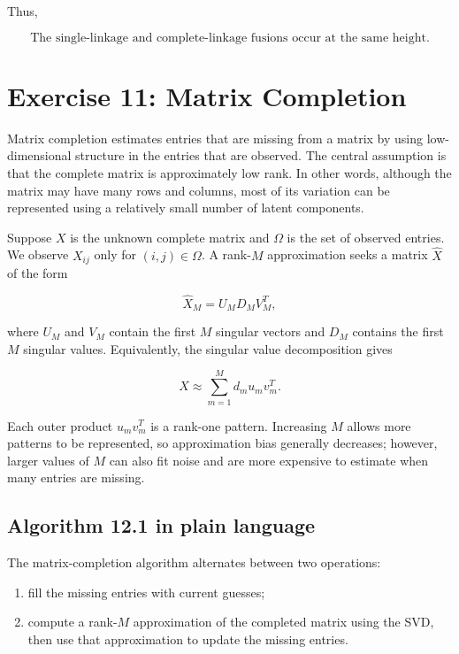 \documentclass[
  11pt,
]{article}
\providecommand{\tightlist}{%
  \setlength{\itemsep}{0pt}\setlength{\parskip}{0pt}}
\begin{document}
Thus,

\[
\boxed{
\text{The single-linkage and complete-linkage fusions occur at the same height.}
}
\]

\section{Exercise 11: Matrix
Completion}\label{exercise-11-matrix-completion}

Matrix completion estimates entries that are missing from a matrix by
using low-dimensional structure in the entries that are observed. The
central assumption is that the complete matrix is approximately low
rank. In other words, although the matrix may have many rows and
columns, most of its variation can be represented using a relatively
small number of latent components.

Suppose \(X\) is the unknown complete matrix and \(\Omega\) is the set
of observed entries. We observe \(X_{ij}\) only for \((i,j)\in\Omega\).
A rank-\(M\) approximation seeks a matrix \(\widehat X\) of the form

\[
\widehat X_M = U_M D_M V_M^T,
\]

where \(U_M\) and \(V_M\) contain the first \(M\) singular vectors and
\(D_M\) contains the first \(M\) singular values. Equivalently, the
singular value decomposition gives

\[
X \approx \sum_{m=1}^{M} d_m u_m v_m^T.
\]

Each outer product \(u_m v_m^T\) is a rank-one pattern. Increasing \(M\)
allows more patterns to be represented, so approximation bias generally
decreases; however, larger values of \(M\) can also fit noise and are
more expensive to estimate when many entries are missing.

\subsection{Algorithm 12.1 in plain
language}\label{algorithm-12.1-in-plain-language}

The matrix-completion algorithm alternates between two operations:

\begin{enumerate}
\def\labelenumi{\arabic{enumi}.}
\tightlist
\item
  fill the missing entries with current guesses;
\item
  compute a rank-\(M\) approximation of the completed matrix using the
  SVD, then use that approximation to update the missing entries.
\end{enumerate}
\end{document}
